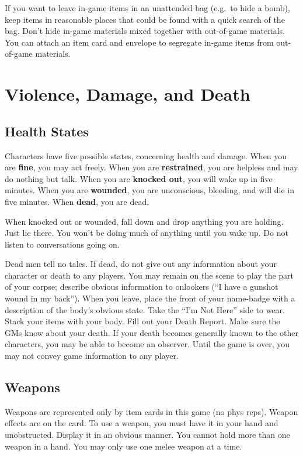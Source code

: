 \documentclass[sheet]{GL2020}
\begin{document}
If you want to leave in-game items in an unattended bag (e.g.\ to hide a bomb), keep items in reasonable places that could be found with a quick search of the bag.  Don't hide in-game materials mixed together with out-of-game materials.  You can attach an item card and envelope to segregate in-game items from out-of-game materials.

\section{Violence, Damage, and Death}

\subsection{Health States}

Characters have five possible states, concerning health and damage. When you are {\bf fine}, you may act freely.  When you are {\bf restrained}, you are helpless and may do nothing but talk.  When you are {\bf knocked out}, you will wake up in five minutes.  When you are {\bf wounded}, you are unconscious, bleeding, and will die in five minutes.  When {\bf dead}, you are dead.

When knocked out or wounded, fall down and drop anything you are holding.  Just lie there.  You won't be doing much of anything until you wake up.  Do not listen to conversations going on.

Dead men tell no tales.  If dead, do not give out any information about your character or death to any players.  You may remain on the scene to play the part of your corpse; describe obvious information to onlookers (``I have a gunshot wound in my back'').  When you leave, place the front of your name-badge with a description of the body's obvious state.  Take the ``I'm Not Here'' side to wear.  Stack your items with your body.  Fill out your Death Report.  Make sure the GMs know about your death.  If your death becomes generally known to the other characters, you may be able to become an observer.  Until the game is over, you may not convey game information to any player.

\subsection{Weapons}

Weapons are represented only by item cards in this game (no phys reps). Weapon effects are on the card.  To use a weapon, you must have it in your hand and unobstructed.  Display it in an obvious manner.  You cannot hold more than one weapon in a hand.  You may only use one melee weapon at a time.
\end{document}
